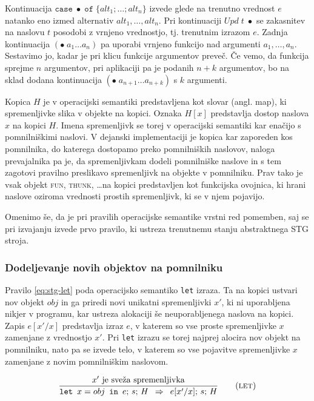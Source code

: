 Kontinuacija $\texttt{case} \; \bullet \; \texttt{of} \; \{ alt_1; \dots; alt_n \}$ izvede glede na trenutno vrednost $e$ natanko eno izmed alternativ $alt_1, \dots, alt_n$. Pri kontinuaciji $\textit{Upd} \; t \; \bullet$ se zakasnitev na naslovu $t$ posodobi z vrnjeno vrednostjo, tj. trenutnim izrazom $e$. Zadnja kontinuacija $(\bullet \; a_1 \dots a_n)$ pa uporabi vrnjeno funkcijo nad argumenti $a_1, \dots, a_n$. Sestavimo jo, kadar je pri klicu funkcije argumentov preveč. Če vemo, da funkcija sprejme $n$ argumentov, pri aplikaciji pa je podanih $n + k$ argumentov, bo na sklad dodana kontinuacija $(\bullet \; a_{n + 1 } \dots a_{ n + k })$ s $k$ argumenti.

Kopica $H$ je v operacijski semantiki predstavljena kot slovar (angl. map), ki spremenljivke slika v objekte na kopici. Oznaka $H[x]$ predstavlja dostop naslova $x$ na kopici $H$. Imena spremenljivk se torej v operacijski semantiki kar enačijo s pomnilniškimi naslovi. V dejanski implementaciji je kopica kar zaporeden kos pomnilnika, do katerega dostopamo preko pomnilniških naslovov, naloga prevajalnika pa je, da spremenljivkam dodeli pomnilniške naslove in s tem zagotovi pravilno preslikavo spremenljivk na objekte v pomnilniku. Prav tako je vsak objekt \textsc{fun}, \textsc{thunk}, \dots na kopici predstavljen kot funkcijska ovojnica, ki hrani naslove oziroma vrednosti prostih spremenljivk, ki se v njem pojavijo.

Omenimo še, da je pri pravilih operacijske semantike vrstni red pomemben, saj se pri izvajanju izvede prvo pravilo, ki ustreza trenutnemu stanju abstraktnega STG stroja.

\subsubsection{Dodeljevanje novih objektov na pomnilniku}

Pravilo \ref{eq:stg-let} poda operacijsko semantiko \texttt{let} izraza. Ta na kopici ustvari nov objekt $obj$ in ga priredi novi unikatni spremenljivki $x'$, ki ni uporabljena nikjer v programu, kar ustreza alokaciji še neuporabljenega naslova na kopici. Zapis $e[x' / x]$ predstavlja izraz $e$, v katerem so vse proste spremenljivke $x$ zamenjane z vrednostjo $x'$. Pri \texttt{let} izrazu se torej najprej alocira nov objekt na pomnilniku, nato pa se izvede telo, v katerem so vse pojavitve spremenljivke $x$ zamenjane z novim pomnilniškim naslovom.

\begin{equation}
\infer[let]{
	\text{$x'$ je sveža spremenljivka}
}{
	\texttt{let} \enspace x = obj \enspace \texttt{in} \enspace e; \, s; \, H
}{
	e[x'/x]; \, s; \, H
}
\label{eq:stg-let}
\end{equation}

